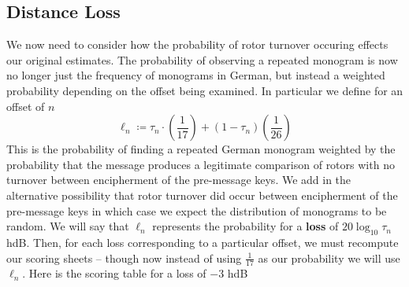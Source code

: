 \subsection{Distance Loss}
We now need to consider how the probability of rotor turnover
occuring effects our original estimates. The probability of
observing a repeated monogram is now no longer just the frequency
of monograms in German, but instead a weighted probability
depending on the offset being examined. In particular we define for
an offset of $n$
\[
	\ell_n \coloneq \tau_n\cdot(\frac{1}{17}) + (1-\tau_n)(\frac{1}{26})
\]
This is the probability of finding a repeated German monogram
weighted by the probability that the message produces a legitimate
comparison of rotors with no turnover between encipherment of the
pre-message keys. We add in the alternative possibility that rotor
turnover did occur between encipherment of the pre-message keys in
which case we expect the distribution of monograms to be random. We
will say that $\ell_n$ represents the probability for a {\bf{loss}}
of $20\log_{10}{\tau_n}$ hdB. Then, for each loss corresponding to
a particular offset, we must recompute our scoring sheets -- though
now instead of using $\frac{1}{17}$ as our probability we will use
$\ell_n$. Here is the scoring table for a loss of $-3$ hdB
